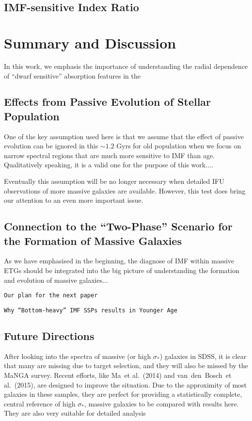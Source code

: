 \documentclass[preprint]{aastex}
\def\etal{{\ et al.~}}
\def\sigstar{$\sigma_{\ast}$}
\begin{document}
\begin{CJK*}{UTF8}{gbsn}
\subsection{IMF-sensitive Index Ratio}

\section{Summary and Discussion} 

  In this work, we emphasis the importance of understanding the radial 
  dependence of ``dwarf sensitive'' absorption features in the 
  
\subsection{Effects from Passive Evolution of Stellar Population}
  
  One of the key assumption used here is that we assume that the effect of 
  passive evolution can be ignored in this $\sim 1.2$ Gyrs for old population
  when we focus on narrow spectral regions that are much more sensitive to 
  IMF than age.  Qualitatively speaking, it is a valid one for the purpose of 
  this work....
  
  Eventually this assumption will be no longer necessary when detailed IFU 
  observations of more massive galaxies are available.  However, this test 
  does bring our attention to an even more important issue.  
   
\subsection{Connection to the ``Two-Phase'' Scenario for the Formation 
of Massive Galaxies}
  
  As we have emphasised in the beginning, the diagnose of IMF within massive 
  ETGs should be integrated into the big picture of understanding the formation 
  and evolution of massive galaxies...
  
  {\tt Our plan for the next paper}
  
  {\tt Why ``Bottom-heavy'' IMF SSPs results in Younger Age}
  
\subsection{Future Directions}
  
  After looking into the spectra of massive (or high \sigstar) galaxies in SDSS, 
  it is clear that many are missing due to target selection, and they will also 
  be missed by the MaNGA survey.  Recent efforts, like Ma\etal (2014) and 
  van~den~Bosch\etal (2015), are designed to improve the situation.  Due to the 
  approximity of most galaxies in these samples, they are perfect for providing 
  a statistically complete, central reference of high \sigstar, massive galaxies 
  to be compared with results here.  They are also very suitable for detailed 
  analysis 


\end{CJK*}
\end{document}
